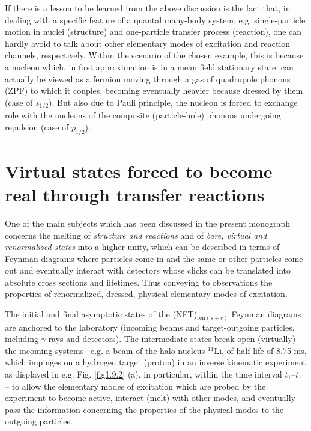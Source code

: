 If there is a lesson to be learned from the above discussion is the fact that, in dealing with a specific feature of a quantal many-body system, e.g. single-particle motion in nuclei (structure) and one-particle transfer process (reaction), one can hardly avoid to talk about other elementary modes of excitation and  reaction channels, respectively. Within the scenario of the chosen example, this is because a nucleon which, in first approximation is in a mean field stationary state, can actually be viewed as a fermion moving through a gas of  quadrupole phonons (ZPF) to which it couples, becoming eventually heavier because dressed by them  (case of $s_{1/2}$). But also due to Pauli principle, the nucleon  is forced to exchange role with the nucleons of the composite (particle-hole) phonons undergoing repulsion (case of $p_{1/2}$).
\section[Virtual states forced to become real]{Virtual states forced to become real through transfer reactions}\label{C6S4}
One of the main subjects which has been discussed in the present monograph concerns the melting of \textit{structure and reactions} and of \textit{bare, virtual and renormalized states} into a higher unity,  which can be described in terms of Feynman diagrams where particles come in and the same or other particles come out and  eventually interact with  detectors whose clicks can be translated into  absolute cross sections and lifetimes. Thus conveying to observations the properties of renormalized, dressed, physical elementary modes of excitation.




The initial and final asymptotic states of the (NFT)$_{\text{ren} (s+r)}$ Feynman diagrams are anchored to the laboratory (incoming beams and target-outgoing particles, including $\gamma$-rays and detectors). The intermediate states break  open (virtually) the incoming systems --e.g. a beam of the halo nucleus $^{11}$Li, of half life of 8.75 ms, which impinges on a hydrogen target (proton) in an inverse kinematic experiment as displayed in e.g. Fig. \ref{fig1.9.2} (a), in particular, within the time interval $t_1$--$t_{11}$-- to allow the elementary modes of excitation which are probed by the experiment to become active, interact (melt) with other modes, and eventually pass the information concerning the properties of the  physical modes to the outgoing particles.


